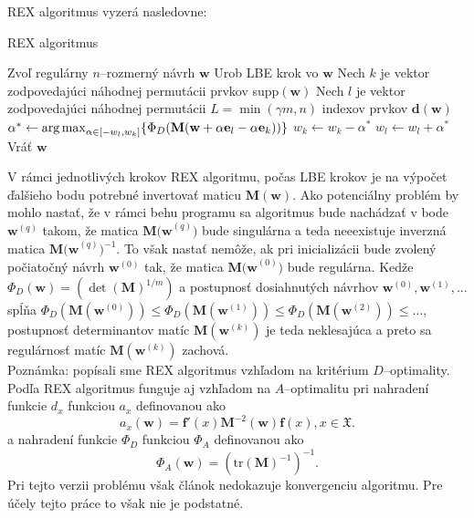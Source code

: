REX algoritmus vyzerá nasledovne:

\begin{algorithm}[H]
	\caption{REX algoritmus \cite{rex_harman}}
	\label{rex}
	\begin{algorithmic}[1]
		\State Zvoľ regulárny $n$--rozmerný návrh $\mathbf w$
			\State Urob LBE krok vo $\mathbf w$
			\State Nech $k$ je vektor zodpovedajúci náhodnej permutácii prvkov supp$(\mathbf w)$
			\State Nech $l$ je vektor zodpovedajúci náhodnej permutácii $L=\min(\gamma m, n)$ indexov prvkov $\mathbf {d(w)}$
					\State $\alpha^* \leftarrow \operatorname*{arg\,max}_{\alpha \in [-w_l, w_k]} \{ \Phi_D(\mathbf M(\mathbf w+\alpha \mathbf e_l -\alpha \mathbf e_k))\}$
						\State $w_k \leftarrow w_k - \alpha^*$
						\State $w_l \leftarrow w_l + \alpha^*$
					\EndIf
				\EndFor
			\EndFor
		\EndWhile
		\State Vráť $\mathbf w$
	\end{algorithmic}
\end{algorithm}

V rámci jednotlivých krokov REX algoritmu, počas LBE krokov je na výpočet ďalšieho bodu potrebné invertovať maticu $\mathbf{M(w)}$. Ako potenciálny problém by mohlo nastať, že v rámci behu programu sa algoritmus bude nachádzať v bode $\mathbf w^{(q)}$ takom, že matica  $\mathbf{M(w}^{(q)})$ bude singulárna a teda neeexistuje inverzná matica $\mathbf{M(w}^{(q)})^{-1}$. To však nastať nemôže, ak pri inicializácii bude zvolený počiatočný návrh $\mathbf w^{(0)}$ tak, že matica $\mathbf{M(w}^{(0)})$ bude regulárna. Kedže $\Phi_D(\mathbf{w})=(\det(\mathbf{M})^{1/m})$ a postupnosť dosiahnutých návrhov $\mathbf w^{(0)}, \mathbf w^{(1)}, \dots$ spĺňa $ \Phi_D(\mathbf M(\mathbf w^{(0)})) \leq \Phi_D(\mathbf M(\mathbf w^{(1)})) \leq \Phi_D(\mathbf M(\mathbf w^{(2)})) \leq \dots$, postupnosť determinantov matíc $\mathbf M(\mathbf w^{(k)})$ je teda neklesajúca a preto sa regulárnosť matíc $\mathbf M(\mathbf w^{(k)})$ zachová.\\

Poznámka: popísali sme REX algoritmus vzhľadom na kritérium $D$--optimality. Podľa \cite{rex_harman} REX algoritmus funguje aj vzhľadom na $A$--optimalitu pri nahradení funkcie $d_x$ funkciou $a_x$ definovanou ako $$a_x(\mathbf w)=\mathbf {f'}(x)\mathbf M^{-2}(\mathbf w)\mathbf f(x), x \in \mathfrak X.$$ a nahradení funkcie $\Phi_D$ funkciou $\Phi_A$ definovanou ako $$\Phi_A(\mathbf{w})=(\text{tr}(\mathbf M)^{-1})^{-1}.$$ Pri tejto verzii problému však článok \cite{rex_harman} nedokazuje konvergenciu algoritmu. Pre účely tejto práce to však nie je podstatné.